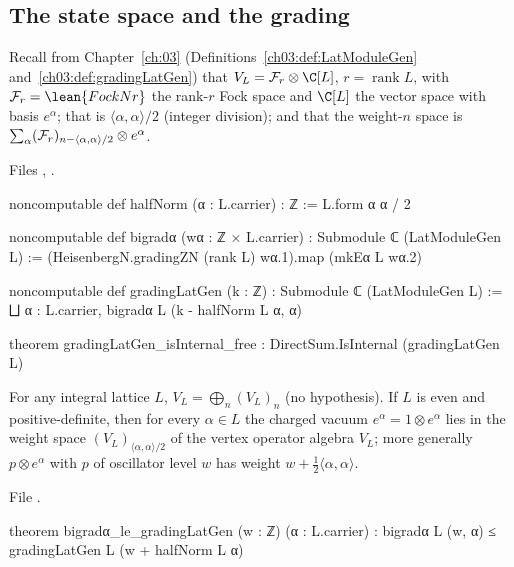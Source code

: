 \subsection{The state space and the grading}

Recall from Chapter~\ref{ch:03} (Definitions~\ref{ch03:def:LatModuleGen} and~\ref{ch03:def:gradingLatGen})
that $V_L=\lfiveF_r\otimes\C[L]$, $r=\operatorname{rank}L$, with $\lfiveF_r=\lean{FockN r}$ the rank-$r$ Fock space
and $\C[L]$ the vector space with basis $e^\alpha$; that  is $\langle\alpha,\alpha\rangle/2$
(integer division); and that the weight-$n$ space is $\sum_\alpha(\mathcal{F}_r)_{n-\langle\alpha,\alpha\rangle/2}\otimes e^\alpha$.

\noindent Files , .
\begin{leancode}
noncomputable def halfNorm (α : L.carrier) : ℤ := L.form α α / 2

noncomputable def bigradα (wα : ℤ × L.carrier) : Submodule ℂ (LatModuleGen L) :=
  (HeisenbergN.gradingZN (rank L) wα.1).map (mkEα L wα.2)

noncomputable def gradingLatGen (k : ℤ) : Submodule ℂ (LatModuleGen L) :=
  ⨆ α : L.carrier, bigradα L (k - halfNorm L α, α)

theorem gradingLatGen_isInternal_free : DirectSum.IsInternal (gradingLatGen L)
\end{leancode}

\begin{theorem}\label{l05:thm:latgrading}
For any integral lattice $L$, $V_L=\bigoplus_n(V_L)_n$ (no hypothesis). If $L$ is even and positive-definite,
then for every $\alpha\in L$ the charged vacuum $e^\alpha=1\otimes e^\alpha$ lies in the weight space
$(V_L)_{\langle\alpha,\alpha\rangle/2}$ of the vertex operator algebra $V_L$; more generally
$p\otimes e^\alpha$ with $p$ of oscillator level $w$ has weight $w+\frac12\langle\alpha,\alpha\rangle$.
\end{theorem}

\noindent File .
\begin{leancode}
theorem bigradα_le_gradingLatGen (w : ℤ) (α : L.carrier) :
    bigradα L (w, α) ≤ gradingLatGen L (w + halfNorm L α)
\end{leancode}

